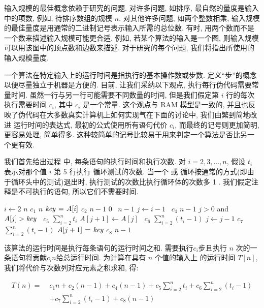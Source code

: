 \documentclass[oneside,10pt,fontset=none]{ctexbook}
\begin{document}
输入规模的最佳概念依赖于研究的问题. 对许多问题, 如排序, 最自然的量度是输入中的项数, 例如, 待排序数组的规模 $n$. 对其他许多问题, 如两个整数相乘, 输入规模的最佳量度是用通常的二进制记号表示输入所需的总位数. 有时, 用两个数而不是一个数来描述输入规模可能更合适. 例如, 若某个算法的输入是一个图, 则输入规模可以用该图中的顶点数和边数来描述. 对于研究的每个问题, 我们将指出所使用的输入规模量度.

一个算法在特定输入上的运行时间是指执行的基本操作数或步数. 定义``步''的概念以便尽量独立于机器是方便的. 目前, 让我们采纳以下观点, 执行每行伪代码需要常量时间. 虽然一行与另一行可能需要不同数量的时间, 但是我们假定第 $i$ 行的每次执行需要时间 $c_i$, 其中 $c_i$ 是一个常量. 这个观点与 RAM 模型是一致的, 并且也反映了伪代码在大多数真实计算机上如何实现气在下面的讨论中, 我们由繁到简地改进 运行时间的表达式, 最初的公式使用所有语句代价 $c_i$, 而最终的记号则更加简明, 更容易处理, 简单得多. 这种较简单的记号比较易于用来判定一个算法是否比另一个更有效.

我们首先给出过程  中, 每条语句的执行时间和执行次数. 对 $i=2, 3, \dots, n$, 假设 $t_i$ 表示对那个值 $i$ 第 5 行执行  循环测试的次数. 当一个  或  循环按通常的方式(即由于循环头中的测试)退出时, 执行测试的次数比执行循环体的次数多 1 . 我们假定注释是不可执行的语旬, 所以它们不需要时间.

\newcommand{\myquad}[1][1]{\hspace*{#1em}\ignorespaces}
\begin{codebox}
\Procname{$\proc{Insertion-Sort}(A, n) \myquad[16] \text{代价}$ \quad \text{次数}}
\li \For $i \gets 2$ \To $n$ \myquad[18] $c_1$ \quad\quad $n$
\li \Do
$\id{key} \gets A[i]$ \myquad[17]\; $c_2$ \quad\quad $n-1$
\li {} \; $0$ \quad\quad\ $n-1$
\li $j \gets i-1$ \myquad[18]\ $c_4$ \quad\quad $n-1$
\li \While $j > 0$ and $A[j] > \id{key}$ \myquad[10]\ $c_5$ \quad\;\; $\sum_{i=2}^{n}t_i$
\li \Do
$A[j+1] \gets A[j]$ \myquad[13]\ $c_6$ \; $\sum_{i=2}^{n}(t_i-1)$
\li $j \gets j-1$ \myquad[16] $c_7$ \; $\sum_{i=2}^{n}(t_i-1)$
\End
\li $A[j+1] \gets \id{key}$ \myquad[16] $c_8$ \quad\quad $n-1$
\End
\end{codebox}

该算法的运行时间是执行每条语句的运行时间之和. 需要执行$c_i$步且执行 $n$ 次的一条语句将贡献$c_in$给总运行时间. 为计算在具有 $n$ 个值的输入上  的运行时间 $T[n]$, 我们将代价与次数列对应元素之积求和, 得:

\begin{equation*}\begin{split}
T(n) =\; &c_1n + c_2(n-1) + c_4(n-1) + c_5\sum_{i=2}^{n}t_i + c_6\sum_{i=2}^{n}(t_i-1) \\
&+c_7\sum_{i=2}^{n}(t_i-1) + c_8(n-1)
\end{split}\end{equation*}
\end{document}
